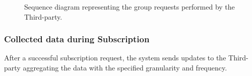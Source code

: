             \begin{figure}[H]
                \centering
                \caption{Sequence diagram representing the group requests performed by the Third-party.}
                \label{fig:Group-request-sequence-diagram}
            \end{figure}
            
        \subsubsection{Collected data during Subscription}    
            After a successful subscription request, the system sends updates to the Third-party aggregating the data with the specified granularity and frequency.
        
